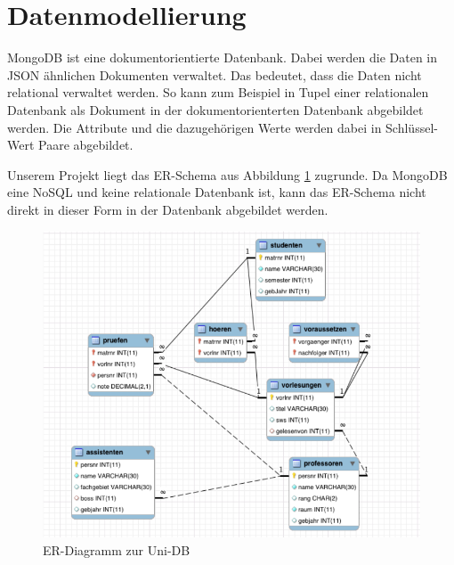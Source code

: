 \section{Datenmodellierung}
\label{kap:ERDiagramm}
MongoDB ist eine dokumentorientierte Datenbank. Dabei werden die Daten in JSON
ähnlichen Dokumenten verwaltet. Das bedeutet, dass die Daten nicht relational
verwaltet werden. So kann zum Beispiel in Tupel einer relationalen Datenbank
als Dokument in der dokumentorienterten Datenbank abgebildet werden. Die
Attribute und die dazugehörigen Werte werden dabei in Schlüssel-Wert Paare
abgebildet. 

Unserem Projekt liegt das ER-Schema aus Abbildung \ref{fig:uni-db}
zugrunde.
Da MongoDB eine NoSQL und keine relationale Datenbank ist, kann das ER-Schema nicht direkt
in dieser Form in der Datenbank abgebildet werden. 

\begin{figure}[h] 
	\centering
		\includegraphics[width=1\textwidth]{./pictures/SQL-DB_ER_Diagramm_UNI-DB.png}
	\caption{ER-Diagramm zur Uni-DB \cite{Kaufmann2016}}
	\label{fig:uni-db}
\end{figure}

